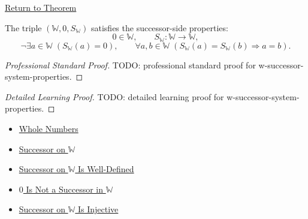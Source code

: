 \newpage
{}
\label{prf:w-successor-system-properties}

\begin{remark*}[Return]
\hyperref[thm:w-successor-system-properties]{Return to Theorem}
\end{remark*}

\begin{theorem*}
The triple $(\mathbb{W},0,S_{\mathbb{W}})$ satisfies the successor-side
properties:
\[
0\in\mathbb{W},\qquad
S_{\mathbb{W}}:\mathbb{W}\to\mathbb{W},
\]
\[
\neg\exists a\in\mathbb{W}\;(S_{\mathbb{W}}(a)=0),
\qquad
\forall a,b\in\mathbb{W}\;
(S_{\mathbb{W}}(a)=S_{\mathbb{W}}(b)\Longrightarrow a=b).
\]
\end{theorem*}

\begin{proof}[Professional Standard Proof]
\LRAProofBodyStart
TODO: professional standard proof for w-successor-system-properties.
\end{proof}

\begin{proof}[Detailed Learning Proof]
\LRAProofBodyStart
TODO: detailed learning proof for w-successor-system-properties.
\end{proof}

\begin{remark*}
\end{remark*}

\begin{dependencies}
\begin{itemize}
  \item \hyperref[def:whole-numbers]{Whole Numbers}
  \item \hyperref[def:successor-on-w]{Successor on $\mathbb{W}$}
  \item \hyperref[thm:successor-on-w-well-defined]{Successor on $\mathbb{W}$ Is Well-Defined}
  \item \hyperref[thm:zero-is-not-successor-in-w]{$0$ Is Not a Successor in $\mathbb{W}$}
  \item \hyperref[thm:successor-on-w-injective]{Successor on $\mathbb{W}$ Is Injective}
\end{itemize}
\end{dependencies}

\clearpage
